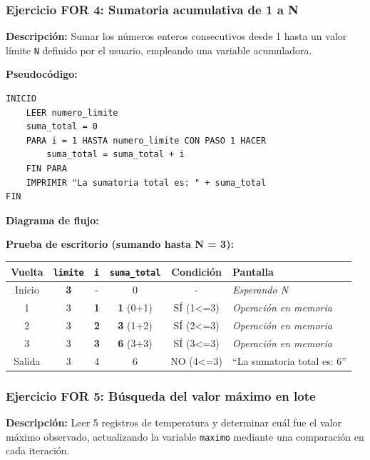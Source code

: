 \subsubsection{Ejercicio FOR 4: Sumatoria acumulativa de 1 a
N}\label{ejercicio-for-4-sumatoria-acumulativa-de-1-a-n}

\textbf{Descripción:} Sumar los números enteros consecutivos desde 1
hasta un valor límite \texttt{N} definido por el usuario, empleando una
variable acumuladora.

\textbf{Pseudocódigo:}

\begin{verbatim}
INICIO
    LEER numero_limite
    suma_total = 0
    PARA i = 1 HASTA numero_limite CON PASO 1 HACER
        suma_total = suma_total + i
    FIN PARA
    IMPRIMIR "La sumatoria total es: " + suma_total
FIN
\end{verbatim}

\textbf{Diagrama de flujo:}



\textbf{Prueba de escritorio (sumando hasta N = 3):}

{\def\LTcaptype{none} %
\begin{longtable}[]{@{}cccccl@{}}
\toprule\noalign{}
Vuelta & \texttt{limite} & \texttt{i} & \texttt{suma\_total} & Condición
& Pantalla \\
\midrule\noalign{}
\endhead
\bottomrule\noalign{}
\endlastfoot
Inicio & \textbf{3} & - & 0 & - & \emph{Esperando N} \\
1 & 3 & \textbf{1} & \textbf{1} (0+1) & SÍ (1\textless=3) &
\emph{Operación en memoria} \\
2 & 3 & \textbf{2} & \textbf{3} (1+2) & SÍ (2\textless=3) &
\emph{Operación en memoria} \\
3 & 3 & \textbf{3} & \textbf{6} (3+3) & SÍ (3\textless=3) &
\emph{Operación en memoria} \\
Salida & 3 & 4 & 6 & NO (4\textless=3) & ``La sumatoria total es: 6'' \\
\end{longtable}
}

\subsubsection{Ejercicio FOR 5: Búsqueda del valor máximo en
lote}\label{ejercicio-for-5-buxfasqueda-del-valor-muxe1ximo-en-lote}

\textbf{Descripción:} Leer 5 registros de temperatura y determinar cuál
fue el valor máximo observado, actualizando la variable \texttt{maximo}
mediante una comparación en cada iteración.

